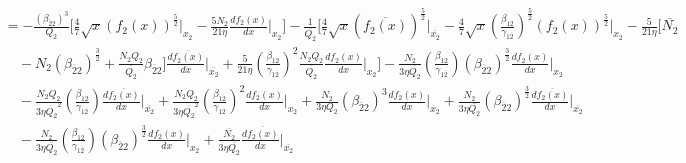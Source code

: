 \documentclass[fleqn, 10pt]{article}
\begin{document}
\begin{equation*}
    \begin{split}
        & = - \frac{(\beta_{\overline{2}2})^{3}}{Q_{2}} \biggl[ \frac{4}{7} \sqrt{x}   (f_{2}(x))^\frac{5}{2} \Bigg|_{x_{2}} - \frac{5 N_{2}}{21 \eta}   \frac{df_{2}(x)}{dx} \Bigg|_{x_{2}} \biggr] - \frac{1}{\overline{Q_{2}}} \biggl[   \frac{4}{7} \sqrt{x} (\overline{f_{2}(x)})^\frac{5}{2} \Bigg|_{\overline{x_{2}}} -   \frac{4}{7} \sqrt{x} \left( \frac{\beta_{12}}{\gamma_{1\overline{2}}}\right)^\frac{5}{2} (f_{2}(x))^\frac{5}{2} \Bigg|_{x_{2}} - \frac{5}{21 \eta } \biggl[ \overline{N_{2}} \\ & \quad - N_{2}(\beta_{\overline{2}2})^{\frac{3}{2}}  + \frac{N_{2} Q_{2}}{\overline{Q_{2}}} \beta_{\overline{2}2}  \biggr]   \frac{d\overline{f_{2}(x)}}{dx} \Bigg|_{\overline{x_{2}}} + \frac{5}{21 \eta} \left( \frac{\beta_{12}}{\gamma_{1\overline{2}}}\right)^{2} \frac{N_{2} Q_{2}}{\overline{Q_{2}}}   \frac{df_{2}(x)}{dx} \Bigg|_{x_{2}} \biggr] - \frac{N_{2}}{3 \eta \overline{Q_{2}}} \left( \frac{\beta_{12}}{\gamma_{1\overline{2}}}\right) (\beta_{\overline{2}2})^\frac{3}{2}   \frac{df_{2}(x)}{dx} \Bigg|_{x_{2}} \\ & \quad - \frac{N_{2} Q_{2}}{3\eta \overline{Q_{2}}^{2}} \left( \frac{\beta_{12}}{\gamma_{1\overline{2}}}\right)   \frac{d\overline{f_{2}(x)}}{dx} \Bigg|_{\overline{x_{2}}} + \frac{N_{2} Q_{2}}{3\eta \overline{Q_{2}}^{2}} \left( \frac{\beta_{12}}{\gamma_{1\overline{2}}}\right)^{2}   \frac{df_{2}(x)}{dx} \Bigg|_{x_{2}} + \frac{N_{2} }{3\eta Q_{2}} (\beta_{\overline{2}2})^{3}   \frac{df_{2}(x)}{dx} \Bigg|_{x_{2}} + \frac{N_{2}}{3\eta \overline{Q_{2}}} (\beta_{\overline{2}2})^{\frac{3}{2}}   \frac{d\overline{f_{2}(x)}}{dx} \Bigg|_{\overline{x_{2}}} \\ & \quad  - \frac{N_{2}}{3\eta \overline{Q_{2}}} \left( \frac{\beta_{12}}{\gamma_{1\overline{2}}}\right) (\beta_{\overline{2}2})^{\frac{3}{2}}   \frac{df_{2}(x)}{dx}\Bigg|_{x_{2}} + \frac{\overline{N_{2}}}{3\eta \overline{Q_{2}}}   \frac{d\overline{f_{2}(x)}}{dx} \Bigg|_{\overline{x_{2}}}
    \end{split}
\end{equation*}
\end{document}
